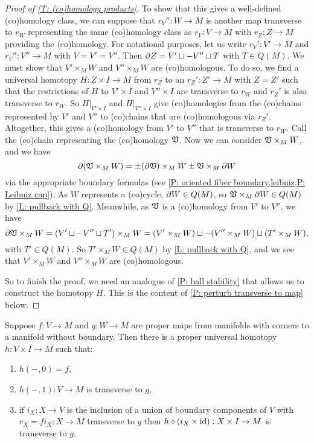 \begin{proof}[Proof of \cref{T: (co)homology products}]
To show that this gives a well-defined (co)homology class, we can suppose that $r_V'' \colon W \to M$ is another map transverse to $r_W$ representing the same (co)homology class as $r_V \colon V \to M$ with $r_Z:Z \to M$ providing the (co)homology. For notational purposes, let us write $r_V' \colon V' \to M$ and $r_V'' \colon V'' \to M$ with $V = V' = V''$. Then $\partial Z = V'\sqcup -V''\sqcup T$ with $T \in Q(M)$. We must show that $V' \times_M W$ and $V'' \times_M W$ are (co)homologous. To do so, we find a universal homotopy $H:Z \times I \to M$ from $r_Z$ to an $r_Z':Z' \to M$ with $Z = Z'$ such that the restrictions of $H$ to $V' \times I$ and $V'' \times I$ are transverse to $r_W$ and $r_Z'$ is also transverse to $r_W$. So $H|_{V' \times I}$ and $H|_{V'' \times I}$ give (co)homologies from the (co)chains represented by $V'$ and $V''$ to (co)chains that are (co)homologous via $r_Z'$. Altogether, this gives a (co)homology from $V'$ to $V''$ that is transverse to $r_W$. Call the (co)chain representing the (co)homology $\mathfrak V$. Now we can consider $\mathfrak V \times_M W$, and we have $$\partial (\mathfrak V \times_M W) = \pm (\partial \mathfrak V) \times_M W\pm \mathfrak V \times_M \partial W$$ via the appropriate boundary formulas (see \cref{P: oriented fiber boundary,leibniz,P: Leibniz cap}). As $W$ represents a (co)cycle, $\partial W \in Q(M)$, so $\mathfrak V \times_M \partial W \in Q(M)$ by \cref{L: pullback with Q}. Meanwhile, as $\mathfrak V$ is a (co)homology from $V'$ to $V''$, we have $$\partial \mathfrak V \times_M W = (V'\sqcup -V''\sqcup T') \times_M W = (V' \times_M W)\sqcup -(V'' \times_M W)\sqcup (T' \times_M W),$$
with $T' \in Q(M)$. So $T' \times_M W \in Q(M)$ by \cref{L: pullback with Q}, and we see that $V' \times_M W$ and $V'' \times_M W$ are (co)homologous.

So to finish the proof, we need an analogue of \cref{P: ball stability} that allows us to construct the homotopy $H$. This is the content of \cref{P: perturb transverse to map} below.
\end{proof}

\begin{proposition}\label{P: perturb transverse to map}
Suppose $f \colon V \to M$ and $g \colon W \to M$ are proper maps from manifolds with corners to a manifold without boundary. Then there is a proper universal homotopy $h \colon V \times I \to M$ such that:
\begin{enumerate}
\item $h(-,0) = f$,

\item $h(-,1) \colon V \to M$ is transverse to $g$,

\item if $i_{X}:X \to V$ is the inclusion of a union of boundary components of $V$ with $r_X = fi_X:X \to M$ transverse to $g$ then $h\circ(i_{X} \times \mathrm{id}):X \times I \to M$ is transverse to $g$.

\end{enumerate}
\end{proposition}


